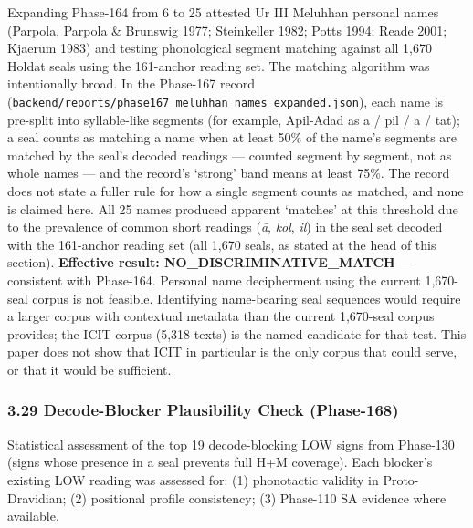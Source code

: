 \documentclass[
]{article}
\newcounter{none} %
\begin{document}
Expanding Phase-164 from 6 to 25 attested Ur III Meluhhan personal
names (Parpola, Parpola \& Brunswig 1977; Steinkeller 1982; Potts 1994; Reade 2001; Kjaerum 1983) and testing phonological segment matching against all
1,670 Holdat seals using the 161-anchor reading set. The matching algorithm was intentionally broad. In the Phase-167 record (\texttt{backend/\allowbreak reports/\allowbreak phase167\_meluhhan\_names\_expanded.json}), each name is pre-split into syllable-like segments (for example, Apil-Adad as a / pil / a / tat); a seal counts as matching a name when at least 50\% of the name's segments are matched by the seal's decoded readings --- counted segment by segment, not as whole names --- and the record's `strong' band means at least 75\%. The record does not state a fuller rule for how a single segment counts as matched, and none is claimed here. All 25 names produced apparent `matches' at this threshold due to the prevalence of common short readings (\emph{ā}, \emph{kol}, \emph{il}) in the seal set decoded with the 161-anchor reading set (all 1,670 seals, as stated at the head of this section). \textbf{Effective
result: NO\_DISCRIMINATIVE\_MATCH} --- consistent with Phase-164.
Personal name decipherment using the current 1,670-seal corpus is not
feasible. Identifying name-bearing seal sequences would require a larger corpus
with contextual metadata than the current 1,670-seal corpus provides;
the ICIT corpus (5,318 texts) is the named candidate for that test. This
paper does not show that ICIT in particular is the only corpus that
could serve, or that it would be sufficient.

\subsubsection{3.29 Decode-Blocker Plausibility Check (Phase-168)}\label{decode-blocker-statistical-analysis-phase-168}

Statistical assessment of the top 19 decode-blocking LOW signs from
Phase-130 (signs whose presence in a seal prevents full H+M coverage). Each
blocker's existing LOW reading was assessed for: (1) phonotactic
validity in Proto-Dravidian; (2) positional profile consistency;
(3) Phase-110 SA evidence where available.
\end{document}
